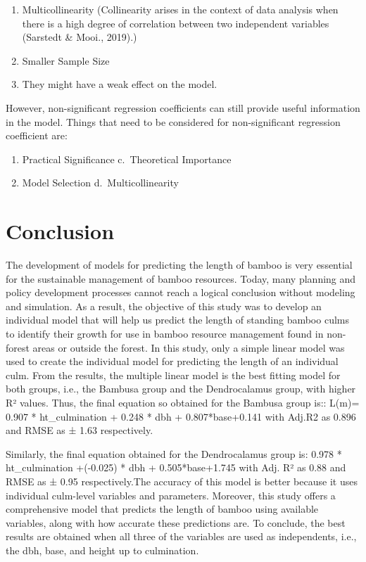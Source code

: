 \documentclass[preprint, 3p,
authoryear]{elsarticle} %
\begin{document}
\begin{enumerate}
\def\labelenumi{\alph{enumi})}
\item
  Multicollinearity (Collinearity arises in the context of data analysis
  when there is a high degree of correlation between two independent
  variables (Sarstedt \& Mooi., 2019).)
\item
  Smaller Sample Size
\item
  They might have a weak effect on the model.
\end{enumerate}

However, non-significant regression coefficients can still provide
useful information in the model. Things that need to be considered for
non-significant regression coefficient are:

\begin{enumerate}
\def\labelenumi{\alph{enumi}.}
\item
  Practical Significance c.~Theoretical Importance
\item
  Model Selection d.~Multicollinearity
\end{enumerate}

\hypertarget{conclusion}{%
\section{Conclusion}\label{conclusion}}

The development of models for predicting the length of bamboo is very
essential for the sustainable management of bamboo resources. Today,
many planning and policy development processes cannot reach a logical
conclusion without modeling and simulation. As a result, the objective
of this study was to develop an individual model that will help us
predict the length of standing bamboo culms to identify their growth for
use in bamboo resource management found in non-forest areas or outside
the forest. In this study, only a simple linear model was used to create
the individual model for predicting the length of an individual culm.
From the results, the multiple linear model is the best fitting model
for both groups, i.e., the Bambusa group and the Dendrocalamus group,
with higher R² values. Thus, the final equation so obtained for the
Bambusa group is:: L(m)= 0.907 * ht\_culmination + 0.248 * dbh +
0.807*base+0.141 with Adj.R2 as 0.896 and RMSE as ± 1.63 respectively.

Similarly, the final equation obtained for the Dendrocalamus group is:
0.978 * ht\_culmination +(-0.025) * dbh + 0.505*base+1.745 with Adj. R²
as 0.88 and RMSE as ± 0.95 respectively.The accuracy of this model is
better because it uses individual culm-level variables and parameters.
Moreover, this study offers a comprehensive model that predicts the
length of bamboo using available variables, along with how accurate
these predictions are. To conclude, the best results are obtained when
all three of the variables are used as independents, i.e., the dbh,
base, and height up to culmination.
\end{document}

